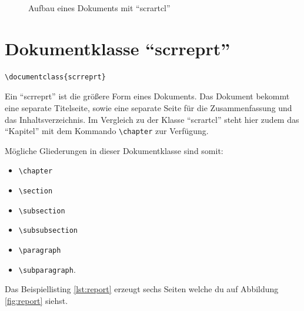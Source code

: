 \begin{figure}[htb]
	\begin{center}
	\end{center}
	\caption{Aufbau eines Dokuments mit \enquote{scrartcl}}
	\label{fig:article}
\end{figure}

\section{Dokumentklasse \enquote{scrreprt}}

\begin{lstlisting}
\documentclass{scrreprt}
\end{lstlisting}

Ein \enquote{scrreprt} ist die größere Form eines Dokuments. Das Dokument bekommt eine separate Titelseite, sowie eine separate Seite für die Zusammenfassung und das Inhaltsverzeichnis. Im Vergleich zu der Klasse \enquote{scrartcl} steht hier zudem das \enquote{Kapitel} mit dem Kommando \texttt{\textbackslash chapter} zur Verfügung.

Mögliche Gliederungen in dieser Dokumentklasse sind somit:

\begin{itemize}
	\item \texttt{\textbackslash chapter}
	\item \texttt{\textbackslash section}
	\item \texttt{\textbackslash subsection}
	\item \texttt{\textbackslash subsubsection}
	\item \texttt{\textbackslash paragraph}
	\item \texttt{\textbackslash subparagraph}.
\end{itemize}

Das Beispiellisting \ref{lst:report} erzeugt sechs Seiten welche du auf Abbildung \ref{fig:report} siehst.

